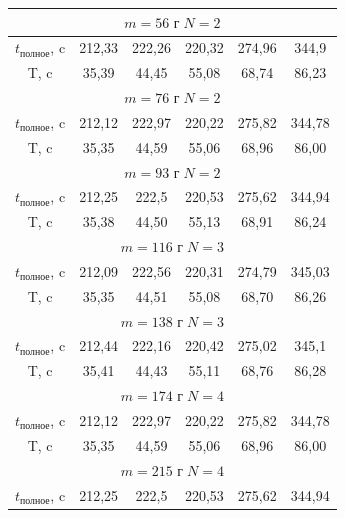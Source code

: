 \documentclass[12pt]{article}
\begin{document}
\begin{table}[h!]
	\begin{center}
		\begin{tabular}{|c|c|c|c|c|c|}
			\hline
			\multicolumn{6}{|c|}{$m = 56 \text{ г}\; N = 2$}                                                      \\ \hline
			$t_{\text{полное}}$, c    & 212,33 & 222,26 & 220,32 & 274,96 & 344,9 \\ \hline
			T, c & 35,39 & 44,45 & 55,08 & 68,74 & 86,23 \\ \hline
			\multicolumn{6}{|c|}{$m = 76 \text{ г}\; N = 2$}                                                     \\ \hline	
			$t_{\text{полное}}$, c     & 212,12 & 222,97 & 220,22 & 275,82 & 344,78 \\ \hline
			T, c & 35,35 & 44,59 & 55,06 & 68,96 & 86,00 \\ \hline
			\multicolumn{6}{|c|}{$m = 93 \text{ г}\; N = 2$}                                                    \\ \hline
			$t_{\text{полное}}$, c    & 212,25 & 222,5  & 220,53 & 275,62 & 344,94 \\ \hline
			T, c & 35,38 & 44,50 & 55,13 & 68,91 & 86,24 \\ \hline
			\multicolumn{6}{|c|}{$m =116 \text{ г}\; N = 3$}                                                     \\ \hline
			$t_{\text{полное}}$, c    & 212,09 & 222,56 & 220,31 & 274,79 & 345,03  \\ \hline
			T, c & 35,35 & 44,51 & 55,08 & 68,70 & 86,26 \\ \hline
			\multicolumn{6}{|c|}{$m = 138 \text{ г}\; N = 3$}                                                      \\ \hline
			$t_{\text{полное}}$, c & 212,44 & 222,16 & 220,42 & 275,02 & 345,1 \\ \hline
			T, c & 35,41 & 44,43 & 55,11 & 68,76 & 86,28 \\ \hline
			\multicolumn{6}{|c|}{$m = 174 \text{ г}\; N = 4$} \\ \hline
				$t_{\text{полное}}$, c     & 212,12 & 222,97 & 220,22 & 275,82 & 344,78 \\ \hline
			T, c & 35,35 & 44,59 & 55,06 & 68,96 & 86,00 \\ \hline
			\multicolumn{6}{|c|}{$m = 215 \text{ г}\; N = 4$}                                                    \\ \hline
			$t_{\text{полное}}$, c    & 212,25 & 222,5  & 220,53 & 275,62 & 344,94 \\ \hline

\end{tabular}
\end{center}
\end{table}
\end{document}
